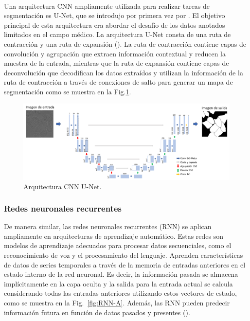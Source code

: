 \documentclass[11pt,a4paper,openany]{article}
\begin{document}
        \\
        
        Una arquitectura CNN ampliamente utilizada para realizar tareas de segmentación es U-Net, que se introdujo por primera vez por \cite{Ronneberger2015}. El objetivo principal de esta arquitectura era abordar el desafío de los datos anotados limitados en el campo médico. La arquitectura U-Net consta de una ruta de contracción y una ruta de expansión (\cite{Yin2023}). La ruta de contracción contiene capas de convolución y agrupación que extraen información contextual y reducen la muestra de la entrada, mientras que la ruta de expansión contiene capas de deconvolución que decodifican los datos extraídos y utilizan la información de la ruta de contracción a través de conexiones de salto para generar un mapa de segmentación como se muestra en la Fig.\ref{fig:A-Unet}.

        \begin{figure}[H]
            \centering
            \includegraphics[width=0.7\linewidth]{Unet.png}
            \caption{Arquitectura CNN U-Net.}
            \label{fig:A-Unet}
        \end{figure}
        
        \subsubsection{Redes neuronales recurrentes}

        De manera similar, las redes neuronales recurrentes (RNN) se aplican ampliamente en arquitecturas de aprendizaje automático. Estas redes son modelos de aprendizaje adecuados para procesar datos secuenciales, como el reconocimiento de voz y el procesamiento del lenguaje. Aprenden características de datos de series temporales a través de la memoria de entradas anteriores en el estado interno de la red neuronal. Es decir, la información pasada se almacena implícitamente en la capa oculta y la salida para la entrada actual se calcula considerando todas las entradas anteriores utilizando estos vectores de estado, como se muestra en la Fig.~\ref{fig:RNN-A}. Además, las RNN pueden predecir información futura en función de datos pasados y presentes (\cite{Yu2022}).
\end{document}
